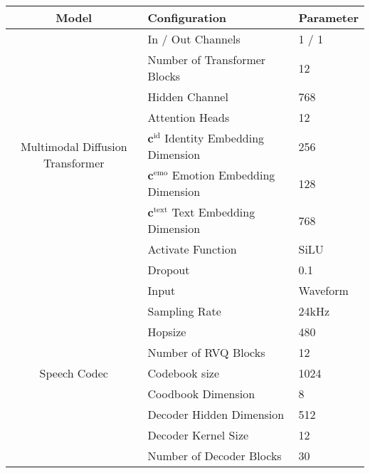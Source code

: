 \begin{table}[h]
\centering
\begin{tabular}{@{}cll@{}}
\toprule
\textbf{Model}                & \textbf{Configuration}       & \textbf{Parameter}                        \\ \midrule
\multirow{9}{*}{Multimodal Diffusion Transformer} 
                              & In / Out Channels &  1 / 1                                  \\
                              & Number of Transformer Blocks &  12                       \\
                              & Hidden Channel &  768        \\
                              & Attention Heads &  12                                \\
                              & $\bm{c}^\text{id}$ Identity Embedding Dimension &  256                    \\
                              & $\bm{c}^\text{emo}$ Emotion Embedding Dimension &  128                    \\
                              & $\bm{c}^\text{text}$ Text Embedding Dimension &  768                    \\
                              & Activate Function &  SiLU                           \\ 
                              & Dropout &  0.1                           \\\midrule
\multirow{9}{*}{Speech Codec} 
                              & Input &  Waveform                                \\
                              & Sampling Rate &  24kHz                                \\
                              & Hopsize &  480                       \\
                              & Number of RVQ Blocks &  12          \\
                              & Codebook size &  1024          \\
                              & Coodbook Dimension &  8          \\
                              & Decoder Hidden Dimension &  512          \\
                              & Decoder Kernel Size &  12          \\
                              & Number of Decoder Blocks &  30          \\\midrule            

\end{tabular}
\end{table}
